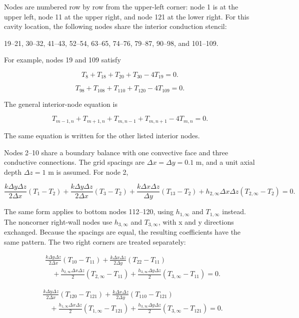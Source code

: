 \documentclass[11pt,a4paper]{article}
\begin{document}
Nodes are numbered row by row from the upper-left corner: node 1 is at the upper left, node 11 at the upper right, and node 121 at the lower right. For this cavity location, the following nodes share the interior conduction stencil:

19--21, 30--32, 41--43, 52--54, 63--65, 74--76, 79--87, 90--98, and 101--109.

For example, nodes 19 and 109 satisfy

\[T_8+T_{18}+T_{20}+T_{30}-4T_{19}=0.\]

\[T_{98}+T_{108}+T_{110}+T_{120}-4T_{109}=0.\]

The general interior-node equation is

\[T_{m-1,n}+T_{m+1,n}+T_{m,n-1}+T_{m,n+1}-4T_{m,n}=0.\]

The same equation is written for the other listed interior nodes.

Nodes 2--10 share a boundary balance with one convective face and three conductive connections. The grid spacings are $\Delta x=\Delta y=0.1$ m, and a unit axial depth $\Delta z=1$ m is assumed. For node 2,

\[\frac{k\Delta y\Delta z}{2\Delta x}(T_1-T_2)+\frac{k\Delta y\Delta z}{2\Delta x}(T_3-T_2)+\frac{k\Delta x\Delta z}{\Delta y}(T_{13}-T_2)+h_{2,\infty}\Delta x\Delta z(T_{2,\infty}-T_2)=0.\]

The same form applies to bottom nodes 112--120, using $h_{1,\infty}$ and $T_{1,\infty}$ instead. The noncorner right-wall nodes use $h_{3,\infty}$ and $T_{3,\infty}$, with x and y directions exchanged. Because the spacings are equal, the resulting coefficients have the same pattern. The two right corners are treated separately:

\[\begin{aligned}&\frac{k\Delta y\Delta z}{2\Delta x}(T_{10}-T_{11})+\frac{k\Delta x\Delta z}{2\Delta y}(T_{22}-T_{11})\\&\quad+\frac{h_{2,\infty}\Delta x\Delta z}{2}(T_{2,\infty}-T_{11})+\frac{h_{3,\infty}\Delta y\Delta z}{2}(T_{3,\infty}-T_{11})=0.\end{aligned}\]

\[\begin{aligned}&\frac{k\Delta y\Delta z}{2\Delta x}(T_{120}-T_{121})+\frac{k\Delta x\Delta z}{2\Delta y}(T_{110}-T_{121})\\&\quad+\frac{h_{1,\infty}\Delta x\Delta z}{2}(T_{1,\infty}-T_{121})+\frac{h_{3,\infty}\Delta y\Delta z}{2}(T_{3,\infty}-T_{121})=0.\end{aligned}\]
\end{document}
